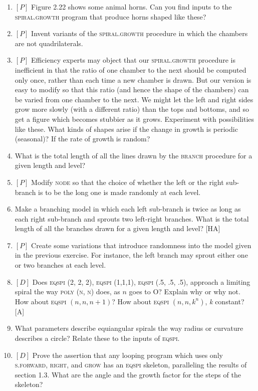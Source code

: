 \documentclass{book}
\begin{document}
\begin{enumerate}
\item $[P]$ Figure 2.22 shows some animal horns. Can you find inputs to the
\textsc{spiral.growth} program that produce horns shaped like these?
\item $[P]$ Invent variants of the \textsc{spiral.growth} procedure in which the
chambers are not quadrilaterals.
\item $[P]$ Efficiency experts may object that our \textsc{spiral}\textsc{.growth} procedure
is inefficient in that the ratio of one chamber to the next should be
computed only once, rather than each time a new chamber is drawn.
But our version is easy to modify so that this ratio (and hence the shape
of the chambers) can be varied from one chamber to the next. We might
let the left and right sides grow more slowly (with a different ratio) than
the tops and bottoms, and so get a figure which becomes stubbier as it
grows. Experiment with possibilities like these. What kinds of shapes
arise if the change in growth is periodic (seasonal)? If the rate of growth
is random?
\item What is the total length of all the lines drawn by the \textsc{branch} procedure
for a given length and level?  
\item $[P]$ Modify \textsc{node} so that the choice of whether the left or the right
sub-branch is to be the long one is made randomly at each level.
\item Make a branching model in which each left sub-branch is twice as
long as each right sub-branch and sprouts two left-right branches. What
is the total length of all the branches drawn for a given length and level?
[HA]
\item $[P]$ Create some variations that introduce randomness into the model
given in the previous exercise. For instance, the left branch may sprout
either one or two branches at each level.
\item $[D]$ Does \textsc{eqspi (2, 2, 2), eqspi (1,1,1), eqspi (.5, .5, .5)},   approach
a limiting spiral the way \textsc{poly (n, n)} does, as $n$ goes to O? Explain why
or why not. How about \textsc{eqspi} $(n, n, n + 1)$? How about \textsc{eqspi} $(n, n, k^{n})$,
{\em k} constant? [A]
\item What parameters describe equiangular spirals the way radius or
curvature describes a circle? Relate these to the inputs of \textsc{eqspi}.  
\item $[D]$ Prove the assertion that any looping program which uses only
\textsc{s}\textsc{.forward}, \textsc{right}, and \textsc{grow} has an \textsc{eqspi} skeleton, paralleling the
results of section 1.3. What are the angle and the growth factor for
the steps of the skeleton?  

\end{enumerate}
\end{document}
